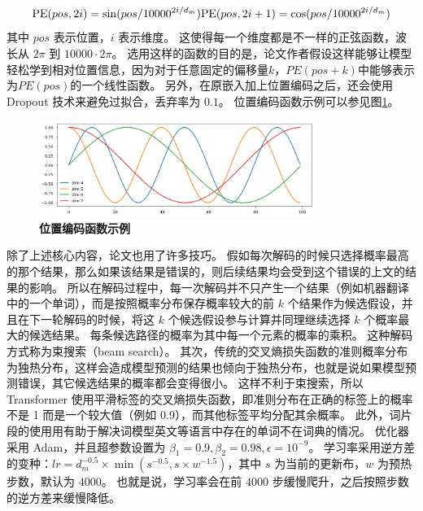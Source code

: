\begin{equation}
	\text{PE}(pos, 2i) = \sin(pos / 10000^{2i/d_m}) \\
	\text{PE}(pos, 2i+1) = \cos(pos / 10000^{2i/d_m})
\end{equation}
其中 $pos$ 表示位置，$i$ 表示维度。
这使得每一个维度都是不一样的正弦函数，波长从 $2\pi$ 到 $10000 \cdot 2\pi$。
选用这样的函数的目的是，论文作者假设这样能够让模型轻松学到相对位置信息，因为对于任意固定的偏移量$k$，$PE(pos+k)$中能够表示为$PE(pos)$的一个线性函数。
另外，在原嵌入加上位置编码之后，还会使用 Dropout \cite{dropout}技术来避免过拟合，丢弃率为 $0.1$。
位置编码函数示例可以参见图\ref{position_encodings}。

\begin{figure}[h!]
	\centering
	\includegraphics[width=0.8\textwidth]{figure/resources/position_encodings.png}
	\caption{\textbf{位置编码函数示例}\label{position_encodings}}
\end{figure}

除了上述核心内容，论文也用了许多技巧。
假如每次解码的时候只选择概率最高的那个结果，那么如果该结果是错误的，则后续结果均会受到这个错误的上文的结果的影响。
所以在解码过程中，每一次解码并不只产生一个结果（例如机器翻译中的一个单词），而是按照概率分布保存概率较大的前 $k$ 个结果作为候选假设，并且在下一轮解码的时候，将这 $k$ 个候选假设参与计算并同理继续选择 $k$ 个概率最大的候选结果。
每条候选路径的概率为其中每一个元素的概率的乘积。
这种解码方式称为束搜索（beam search）。
其次，传统的交叉熵损失函数的准则概率分布为独热分布，这样会造成模型预测的结果也倾向于独热分布，也就是说如果模型预测错误，其它候选结果的概率都会变得很小。
这样不利于束搜索，所以 Transformer 使用平滑标签的交叉熵损失函数，即准则分布在正确的标签上的概率不是 1 而是一个较大值（例如 0.9），而其他标签平均分配其余概率。
此外，词片段\cite{subword}的使用用有助于解决词模型英文等语言中存在的单词不在词典的情况。
优化器采用 Adam\cite{adam}，并且超参数设置为 $\beta_1 = 0.9, \beta_2=0.98, \epsilon=10^{-9}$。
学习率采用逆方差的变种：$lr = d_m^{-0.5} \times \min(s^{-0.5}, s \times w^{-1.5})$，其中 $s$ 为当前的更新布，$w$ 为预热步数，默认为 $4000$。
也就是说，学习率会在前 $4000$ 步缓慢爬升，之后按照步数的逆方差来缓慢降低。

